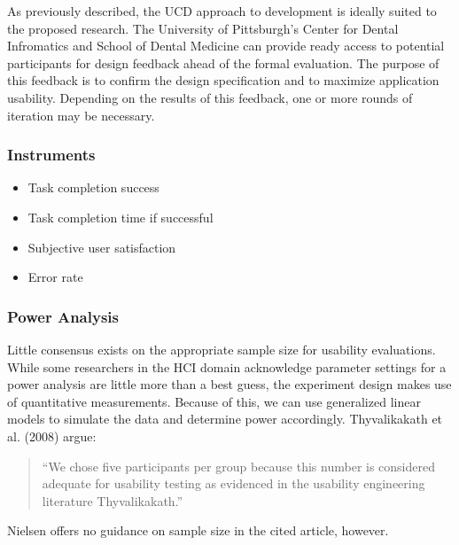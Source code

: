 \documentclass[11pt]{article}
\begin{document}
As previously described, the UCD approach to development is ideally suited to the proposed research. The University of Pittsburgh's Center for Dental Infromatics and School of Dental Medicine can provide ready access to potential participants for design feedback ahead of the formal evaluation. The purpose of this feedback is to confirm the design specification and to maximize application usability. Depending on the results of this feedback, one or more rounds of iteration may be necessary.

\subsubsection{Instruments}
\begin{itemize}
\item{Task completion success}

\item{Task completion time if successful}

\item{Subjective user satisfaction}

\item{Error rate}
\end{itemize}




\subsubsection{Power Analysis}

Little consensus exists on the appropriate sample size for usability evaluations\cite{Virzi:1992ve,Lewis:1994ly,Turner:2006zr,Nielsen:1993ys}. While some researchers in the HCI domain acknowledge parameter settings for a power analysis are little more than a best guess, the experiment design makes use of quantitative measurements. Because of this, we can use generalized linear models to simulate the data and determine power accordingly. Thyvalikakath et al. (2008) argue:
\begin{quote}
\small{``We chose five participants per group because this number is considered adequate for usability testing as evidenced in the usability engineering literature Thyvalikakath\cite{Nielsen1994Enhancing-the-e}.''}
\end{quote}
\noindent Nielsen offers no guidance on sample size in the cited article, however. 
\end{document}
